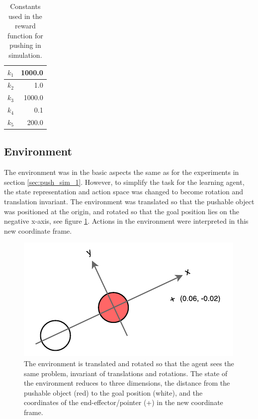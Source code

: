 \begin{table}
    \centering
    \begin{tabular}{l|r}
        $k_1$ & 1000.0 \\
        \hline
        $k_2$ & 1.0 \\
        \hline
        $k_3$ & 1000.0 \\
        \hline
        $k_4$ & 0.1 \\
        \hline
        $k_5$ & 200.0
    \end{tabular}

    \caption{Constants used in the reward function for pushing in simulation.}

    \label{table:ddpg-pushing-constants}

\end{table}

\subsection{Environment}

The environment was in the basic aspects the same as for the experiments in
section \ref{sec:push_sim_1}. However, to simplify the task for the learning
agent, the state representation and action space was changed to become rotation
and translation invariant. The environment was translated so that the pushable
object was positioned at the origin, and rotated so that the goal position lies
on the negative x-axis, see figure \ref{fig:ddpg-coordinates}. Actions in the
environment were interpreted in this new coordinate frame.

\begin{figure}[h!]
    \centering
    \includegraphics[width=0.5 \textwidth]{res/ddpg-coordinates.pdf}

    \caption{The environment is translated and rotated so that the agent sees the same
    problem, invariant of translations and rotations. The state of the environment
    reduces to three dimensions, the distance from the pushable object (red) to the
    goal position (white), and the coordinates of the end-effector/pointer (+) in
    the new coordinate frame.}

    \label{fig:ddpg-coordinates}

\end{figure}

